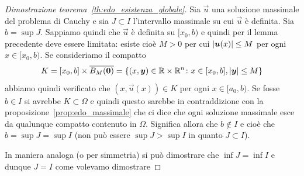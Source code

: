 \begin{proof}[Dimostrazione teorema~\ref{th:edo_esistenza_globale}]
Sia $\vec u$ una soluzione massimale del problema di Cauchy e sia
$J\subset I$ l'intervallo massimale su cui $\vec u$ è definita.
Sia $b=\sup J$. Sappiamo quindi che $\vec u$ è definita su $[x_0,b)$
e quindi per il lemma precedente deve essere limitata: esiste cioè
$M>0$ per cui ${\left|\boldsymbol u(x)\right|}\le M$ per ogni $x\in[x_0,b)$.
Se consideriamo il compatto
\[
K=[x_0,b] \times \overline{B_M(\boldsymbol 0)}
 = {\left\{ (x,\boldsymbol y)\in {\mathbb R} \times {\mathbb R}^n\colon x\in [x_0,b], {\left|\boldsymbol y\right|}\le M \right\}}
\]
abbiamo quindi verificato che $(x,\vec u(x))\in K$ per ogni $x\in [a_0,b)$.
Se fosse $b\in I$ si avrebbe $K\subset \Omega$ e quindi questo sarebbe
in contraddizione con la proposizione~\ref{prop:edo_massimale} che
ci dice che ogni soluzione massimale esce da qualunque compatto contenuto
in $\Omega$. Significa allora che $b\not \in I$ e cioè che $b = \sup J = \sup I$
(non può essere $\sup J>\sup I$ in quanto $J\subset I$).

In maniera analoga (o per simmetria) si può dimostrare che $\inf J=\inf I$
e dunque $J=I$ come volevamo dimostrare
\end{proof}

